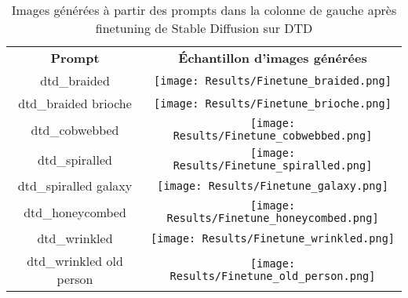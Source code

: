 \documentclass{article}
\begin{document}
\begin{adjustwidth}{-2.5cm}{-2cm}
\begin{minipage}{1.0\textwidth}
    \begin{table}[H]
        \centering
        \begin{tabularx}{400pt}{cc}
        \textbf{Prompt} & \textbf{Échantillon d'images générées}\\
        dtd\_braided &
        \begin{minipage}{0.8\textwidth}
        \texttt{[image: Results/Finetune\_braided.png]}
        \end{minipage}\\[0.9cm]
        dtd\_braided brioche &
        \begin{minipage}{0.8\textwidth}
        \texttt{[image: Results/Finetune\_brioche.png]}
        \end{minipage}\\[0.9cm]
        dtd\_cobwebbed &
        \begin{minipage}{0.8\textwidth}
        \texttt{[image: Results/Finetune\_cobwebbed.png]}
        \end{minipage}\\[0.9cm]
        dtd\_spiralled &
        \begin{minipage}{0.8\textwidth}
        \texttt{[image: Results/Finetune\_spiralled.png]}
        \end{minipage}\\[0.9cm]
        dtd\_spiralled galaxy &
        \begin{minipage}{0.8\textwidth}
        \texttt{[image: Results/Finetune\_galaxy.png]}
        \end{minipage}\\[0.9cm]
        dtd\_honeycombed &
        \begin{minipage}{0.8\textwidth}
        \texttt{[image: Results/Finetune\_honeycombed.png]}
        \end{minipage}\\[0.9cm]
        dtd\_wrinkled &
        \begin{minipage}{0.8\textwidth}
        \texttt{[image: Results/Finetune\_wrinkled.png]}
        \end{minipage}\\[0.9cm]
        dtd\_wrinkled old person &
        \begin{minipage}{0.8\textwidth}
        \texttt{[image: Results/Finetune\_old\_person.png]}
        \end{minipage}\\
        \end{tabularx}
    \caption{Images générées à partir des prompts dans la colonne de gauche après finetuning de Stable Diffusion sur DTD}
    \label{finetune}
    \end{table}
\end{minipage}
\end{adjustwidth}
\end{document}
